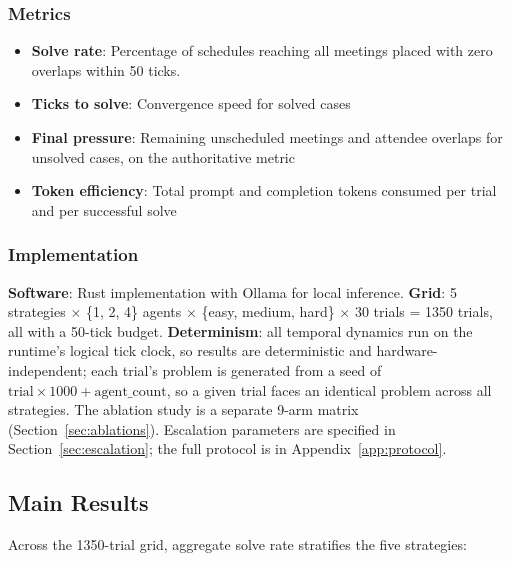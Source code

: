 \subsubsection{Metrics}

\begin{itemize}
\item \textbf{Solve rate}: Percentage of schedules reaching all meetings placed with zero overlaps within 50 ticks.
\item \textbf{Ticks to solve}: Convergence speed for solved cases
\item \textbf{Final pressure}: Remaining unscheduled meetings and attendee overlaps for unsolved cases, on the authoritative metric
\item \textbf{Token efficiency}: Total prompt and completion tokens consumed per trial and per successful solve
\end{itemize}

\subsubsection{Implementation}

\textbf{Software}: Rust implementation with Ollama for local inference. \textbf{Grid}: 5 strategies $\times$ \{1, 2, 4\} agents $\times$ \{easy, medium, hard\} $\times$ 30 trials = 1350 trials, all with a 50-tick budget. \textbf{Determinism}: all temporal dynamics run on the runtime's logical tick clock, so results are deterministic and hardware-independent; each trial's problem is generated from a seed of $\text{trial} \times 1000 + \text{agent\_count}$, so a given trial faces an identical problem across all strategies. The ablation study is a separate 9-arm matrix (Section~\ref{sec:ablations}). Escalation parameters are specified in Section~\ref{sec:escalation}; the full protocol is in Appendix~\ref{app:protocol}.

\subsection{Main Results}
\label{sec:main-results}

Across the 1350-trial grid, aggregate solve rate stratifies the five strategies:

